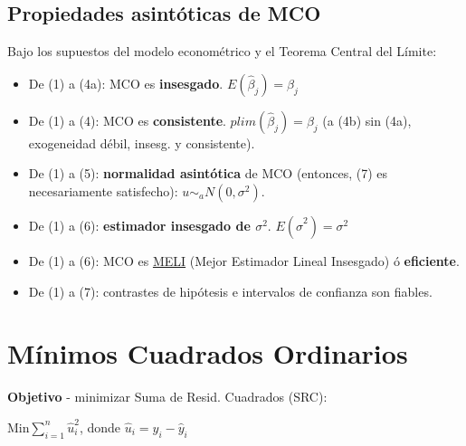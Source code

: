 \documentclass[10pt, a4paper, landscape]{extarticle}
\begin{document}
\begin{multicols}{3}
	\subsection*{Propiedades asintóticas de MCO}
		Bajo los supuestos del modelo econométrico y el Teorema Central del Límite:
		\begin{itemize}[leftmargin=*]
			\item De (1) a (4a): MCO es \textbf{insesgado}. $E(\hat{\beta}_j) = \beta_j$
			\item De (1) a (4): MCO es \textbf{consistente}. $plim(\hat{\beta}_j) = \beta_j$ (a (4b) sin (4a), exogeneidad débil, insesg. y consistente).
			\item De (1) a (5): \textbf{normalidad asintótica} de MCO (entonces, (7) es necesariamente satisfecho): $u \sim_a N(0,\sigma^2)$.
			\item De (1) a (6): \textbf{estimador insesgado de $\sigma^2$}. $E(\hat{\sigma}^2) = \sigma^2$
			\item De (1) a (6): MCO es \textcolor{blue}{\href{https://www.youtube.com/watch?v=68ugkg9RePc}{MELI}} (Mejor Estimador Lineal Insesgado) ó \textbf{eficiente}. 
			\item De (1) a (7): contrastes de hipótesis e intervalos de confianza son fiables.
		\end{itemize}

\section*{Mínimos Cuadrados Ordinarios}
	\textbf{Objetivo} - minimizar Suma de Resid. Cuadrados (SRC):
	\begin{center}
		$\text{Min} \sum_{i=1}^n \hat{u}_i^2$, donde $\hat{u}_i = y_i - \hat{y}_i$
	\end{center}

\end{multicols}
\end{document}
